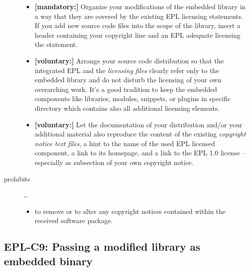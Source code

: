 \begin{description}
\begin{itemize}
  \item \textbf{[mandatory:]} Organize your modifications of the embedded
  library in a way that they are covered by the existing EPL licensing
  statements. If you add new source code files into the scope of the library,
  insert a header containing your copyright line and an EPL adequate licensing
  the statement.
       
  \item \textbf{[voluntary:]} Arrange your source code distribution so that the
  integrated EPL and the \emph{licensing files} clearly refer only to the
  embedded library and do not disturb the licensing of your own overarching
  work. It's a good tradition to keep the embedded components like libraries,
  modules, snippets, or plugins in specific directory which contains also all
  additional licensing elements.
  
  \item \textbf{[voluntary:]} Let the documentation of your distribution and/or
  your additional material also reproduce the content of the existing
  \emph{copyright notice text files}, a hint to the name of the used EPL
  licensed component, a link to its homepage, and a link to the EPL 1.0 license
  -- especially as subsection of your own copyright notice.
 
\end{itemize}

\item[prohibits] \ldots
\begin{itemize}
  \item to remove or to alter any copyright notices contained within the
  received software package.
\end{itemize}

\end{description}


\subsection{EPL-C9: Passing a modified library as embedded binary}
\label{OSUC-10B-EPL}

